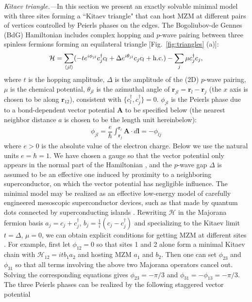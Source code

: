 \documentclass[aps,prb,twocolumn,showpacs,amsmath,amssymb,superscriptaddress]{revtex4-2}
\renewcommand{\vec}[1]{\mathbf{#1}}
\newcommand{\ham}{\mathcal{H}}
\newcommand{\cc}{c^{\dagger}}
\newcommand{\de}{\Delta}
\begin{document}
\emph{Kitaev triangle.---}In this section we present an exactly solvable minimal model with three sites forming a ``Kitaev triangle" that can host MZM at different pairs of vertices controlled by Peierls phases on the edges. The Bogoliubov-de Gennes (BdG) Hamiltonian includes complex hopping and $p$-wave pairing between three spinless fermions forming an equilateral triangle [Fig.~\ref{fig:triangles} (a)]:
\begin{equation}\label{eq:HBdG}
  \ham = \sum_{\langle j l \rangle} (-te^{i\phi_{jl}}\cc_{j} c_l + \de e^{i\theta_{jl}} c_{j} c_l + {\rm h.c.}) - \sum_{j} \mu \cc_j c_j,
\end{equation}
where $t$ is the hopping amplitude, $\de$ is the amplitude of the (2D) $p$-wave pairing, $\mu$ is the chemical potential, $\theta_{jl}$ is the azimuthal angle of $\mathbf r_{jl} = \mathbf r_l - \mathbf r_j$ (the $x$ axis is chosen to be along $\mathbf r_{12}$), consistent with $\{c^\dag_l, c^\dag_j\} = 0$. $\phi_{jl}$ is the Peierls phase due to a bond-dependent vector potential $\mathbf A$ to be specified below (the nearest neighbor distance $a$ is chosen to be the length unit hereinbelow):
\begin{eqnarray}
\phi_{jl} = \dfrac{e}{\hbar} \int_{\mathbf r_j}^{\mathbf r_{l}} \vec{A} \cdot d\vec{l} = -\phi_{lj}
\end{eqnarray}
where $e>0$ is the absolute value of the electron charge. Below we use the natural units $e=\hbar=1$. We have chosen a gauge so that the vector potential only appears in the normal part of the Hamiltonian \cite{DeGennes_book}, and the $p$-wave gap $\Delta$ is assumed to be an effective one induced by proximity to a neighboring superconductor, on which the vector potential has negligible influence. The minimal model may be realized as an effective low-energy model of carefully engineered mesoscopic superconductor devices, such as that made by quantum dots connected by superconducting islands \cite{dvirRealizationMinimalKitaev2023}. Rewriting $\mathcal{H}$ in the Majorana fermion basis $a_{j} = c_j + c^\dag_j$, $b_j = \frac{1}{i}(c_j - c^\dag_j)$ and specializing to the Kitaev limit $t=\de$, $\mu=0$, we can obtain explicit conditions for getting MZM at different sites \cite{supp}. For example, first let $\phi_{12} = 0$ so that sites 1 and 2 alone form a minimal Kitaev chain with $\mathcal{H}_{12} = itb_1a_2$ and hosting MZM $a_1$ and $b_2$. Then one can set $\phi_{23}$ and $\phi_{31}$ so that all terms involving the above two Majorana operators cancel out. Solving the corresponding equations gives $\phi_{23} = -\pi/3$ and $\phi_{31} =-\phi_{13} = -\pi/3$. The three Peierls phases can be realized by the following staggered vector potential
\end{document}
